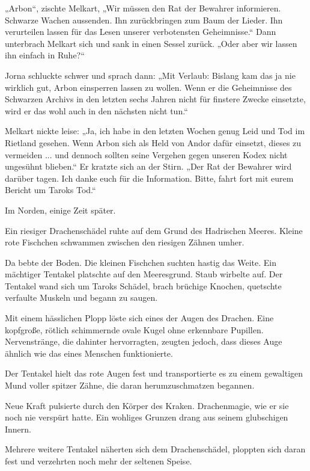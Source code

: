 „Arbon“, zischte Melkart, „Wir müssen den Rat der Bewahrer informieren. Schwarze Wachen aussenden. Ihn zurückbringen zum Baum der Lieder. Ihn verurteilen lassen für das Lesen unserer verbotensten Geheimnisse.“ Dann unterbrach Melkart sich und sank in einen Sessel zurück. „Oder aber wir lassen ihn einfach in Ruhe?“

Jorna schluckte schwer und sprach dann: „Mit Verlaub: Bislang kam das ja nie wirklich gut, Arbon einsperren lassen zu wollen. Wenn er die Geheimnisse des Schwarzen Archivs in den letzten sechs Jahren nicht für finstere Zwecke einsetzte, wird er das wohl auch in den nächsten nicht tun.“

Melkart nickte leise: „Ja, ich habe in den letzten Wochen genug Leid und Tod im Rietland gesehen. Wenn Arbon sich als Held von Andor dafür einsetzt, dieses zu vermeiden ... und dennoch sollten seine Vergehen gegen unseren Kodex nicht ungesühnt blieben.“ Er kratzte sich an der Stirn. „Der Rat der Bewahrer wird darüber tagen. Ich danke euch für die Information. Bitte, fahrt fort mit eurem Bericht um Taroks Tod.“



\trennzeichen



Im Norden, einige Zeit später.\bigskip



Ein riesiger Drachenschädel ruhte auf dem Grund des Hadrischen Meeres. Kleine rote Fischchen schwammen zwischen den riesigen Zähnen umher.

Da bebte der Boden. Die kleinen Fischchen suchten hastig das Weite. Ein mächtiger Tentakel platschte auf den Meeresgrund. Staub wirbelte auf. Der Tentakel wand sich um Taroks Schädel, brach brüchige Knochen, quetschte verfaulte Muskeln und begann zu saugen.

Mit einem hässlichen Plopp löste sich eines der Augen des Drachen. Eine kopfgroße, rötlich schimmernde ovale Kugel ohne erkennbare Pupillen. Nervenstränge, die dahinter hervorragten, zeugten jedoch, dass dieses Auge ähnlich wie das eines Menschen funktionierte.

Der Tentakel hielt das rote Augen fest und transportierte es zu einem gewaltigen Mund voller spitzer Zähne, die daran herumzuschmatzen begannen.

Neue Kraft pulsierte durch den Körper des Kraken. Drachenmagie, wie er sie noch nie verspürt hatte. Ein wohliges Grunzen drang aus seinem glubschigen Innern.

Mehrere weitere Tentakel näherten sich dem Drachenschädel, ploppten sich daran fest und verzehrten noch mehr der seltenen Speise.

